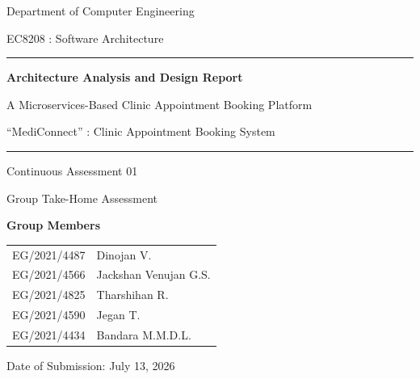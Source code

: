 \documentclass[12pt,a4paper]{article}
\begin{document}
\begin{titlepage}
\centering
\vspace*{0.6cm}
{\Large Department of Computer Engineering\par}
\vspace{0.3cm}
{\large EC8208 : Software Architecture\par}
\vspace{1.4cm}

\rule{\linewidth}{0.5mm}\par
\vspace{0.5cm}
{\Huge\bfseries\color{navy} Architecture Analysis and Design Report\par}
\vspace{0.4cm}
{\LARGE A Microservices-Based Clinic Appointment Booking Platform\par}
\vspace{0.3cm}
{\large ``MediConnect'' : Clinic Appointment Booking System\par}
\vspace{0.5cm}
\rule{\linewidth}{0.5mm}\par

\vspace{1.0cm}
{\large Continuous Assessment 01\par}
\vspace{0.2cm}
{\large Group Take-Home Assessment\par}

\vfill

{\large\bfseries Group Members\par}
\vspace{0.4cm}
{\renewcommand{\arraystretch}{1.35}
\begin{tabular}{ll}
EG/2021/4487 & Dinojan V.\\
EG/2021/4566 & Jackshan Venujan G.S.\\
EG/2021/4825 & Tharshihan R.\\
EG/2021/4590 & Jegan T.\\
EG/2021/4434 & Bandara M.M.D.L.\\
\end{tabular}\par}

\vspace{0.9cm}
{\large Date of Submission: July 13, 2026\par}
\vspace{0.4cm}
\end{titlepage}

\tableofcontents
\thispagestyle{fancy}
\newpage
\end{document}
